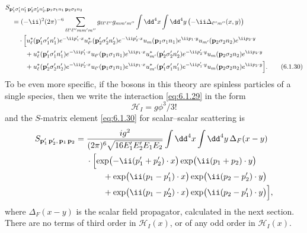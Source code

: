 \begin{align}
&S_{\mathbf p'_1\sigma'_1n'_1\,\mathbf p'_2\sigma'_2n'_2,
       \mathbf p_1\sigma_1n_1\,\mathbf p_2\sigma_2n_2}
\notag\\
&\quad=(-\ii)^2(2\pi)^{-6}
 \sum_{\ell\ell'\ell''mm'm''}
 g_{\ell\ell'\ell''}g_{mm'm''}
 \int \dd^4x\int \dd^4y\,
 \bigl(-\ii\Delta_{\ell''m''}(x,y)\bigr)
\notag\\
&\qquad\cdot\Bigl[
 u_\ell^*(\mathbf p'_1\sigma'_1n'_1)e^{-\ii p'_1\cdot x}
 u_{\ell'}^*(\mathbf p'_2\sigma'_2n'_2)e^{-\ii p'_2\cdot x}
 u_m(\mathbf p_1\sigma_1n_1)e^{\ii p_1\cdot y}
 u_{m'}(\mathbf p_2\sigma_2n_2)e^{\ii p_2\cdot y}
\notag\\
&\qquad\quad+
 u_\ell^*(\mathbf p'_1\sigma'_1n'_1)e^{-\ii p'_1\cdot x}
 u_{\ell'}(\mathbf p_1\sigma_1n_1)e^{\ii p_1\cdot x}
 u_{m'}^*(\mathbf p'_2\sigma'_2n'_2)e^{-\ii p'_2\cdot y}
 u_m(\mathbf p_2\sigma_2n_2)e^{\ii p_2\cdot y}
\notag\\
&\qquad\quad+
 u_\ell^*(\mathbf p'_2\sigma'_2n'_2)e^{-\ii p'_2\cdot x}
 u_{\ell'}(\mathbf p_1\sigma_1n_1)e^{\ii p_1\cdot x}
 u_{m'}^*(\mathbf p'_1\sigma'_1n'_1)e^{-\ii p'_1\cdot y}
 u_m(\mathbf p_2\sigma_2n_2)e^{\ii p_2\cdot y}
 \Bigr].
\tag{6.1.30}
\label{eq:6.1.30}
\end{align}
To be even more specific, if the bosons in this theory are spinless particles
of a single species, then we write the interaction \eqref{eq:6.1.29} in the form
\begin{equation}
\mathcal H_I=g\phi^3/3!
\tag{6.1.31}
\label{eq:6.1.31}
\end{equation}
and the $S$-matrix element \eqref{eq:6.1.30} for scalar--scalar scattering is
\begin{align*}
S_{\mathbf p'_1\,\mathbf p'_2,\,\mathbf p_1\,\mathbf p_2}
={}&\frac{ig^2}{(2\pi)^6\sqrt{16E'_1E'_2E_1E_2}}
 \int \dd^4x\int \dd^4y\,\Delta_F(x-y)
\notag\\
&\cdot\Bigl[
 \exp\bigl(-\ii(p'_1+p'_2)\cdot x\bigr)
 \exp\bigl(\ii(p_1+p_2)\cdot y\bigr)
\notag\\
&\qquad+
 \exp\bigl(\ii(p_1-p'_1)\cdot x\bigr)
 \exp\bigl(\ii(p_2-p'_2)\cdot y\bigr)
\notag\\
&\qquad+
 \exp\bigl(\ii(p_1-p'_2)\cdot x\bigr)
 \exp\bigl(\ii(p_2-p'_1)\cdot y\bigr)
 \Bigr],
\end{align*}
where $\Delta_F(x-y)$ is the scalar field propagator, calculated in the next
section. There are no terms of third order in $\mathcal H_I(x)$, or of any odd
order in $\mathcal H_I(x)$.

